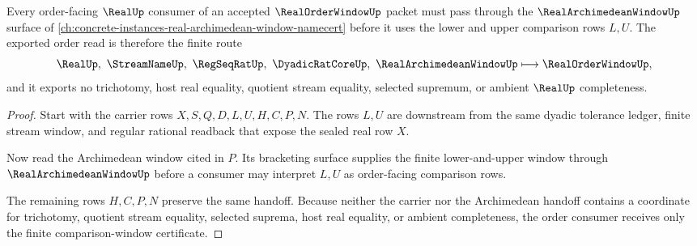 \begin{theorem}
\label{thm:real-order-window-archimedean-handoff}
Every order-facing $\RealUp$ consumer of an accepted $\RealOrderWindowUp$ packet must pass through the $\RealArchimedeanWindowUp$ surface of \autoref{ch:concrete-instances-real-archimedean-window-namecert} before it uses the lower and upper comparison rows $L,U$. The exported order read is therefore the finite route
$$
\RealUp,\ \StreamNameUp,\ \RegSeqRatUp,\ \DyadicRatCoreUp,\ \RealArchimedeanWindowUp \longmapsto \RealOrderWindowUp,
$$
and it exports no trichotomy, host real equality, quotient stream equality, selected supremum, or ambient $\RealUp$ completeness.
\end{theorem}
\begin{proof}
Start with the carrier rows $X,S,Q,D,L,U,H,C,P,N$. The rows $L,U$ are downstream from the same dyadic tolerance ledger, finite stream window, and regular rational readback that expose the sealed real row $X$.

Now read the Archimedean window cited in $P$. Its bracketing surface supplies the finite lower-and-upper window through $\RealArchimedeanWindowUp$ before a consumer may interpret $L,U$ as order-facing comparison rows.

The remaining rows $H,C,P,N$ preserve the same handoff. Because neither the carrier nor the Archimedean handoff contains a coordinate for trichotomy, quotient stream equality, selected suprema, host real equality, or ambient completeness, the order consumer receives only the finite comparison-window certificate.
\end{proof}


\begin{closurestatus}{\RealOrderWindowUp}
  \theoryclosure{\seedClosure}
  \formalstatus{\unformalizedV}
\end{closurestatus}
